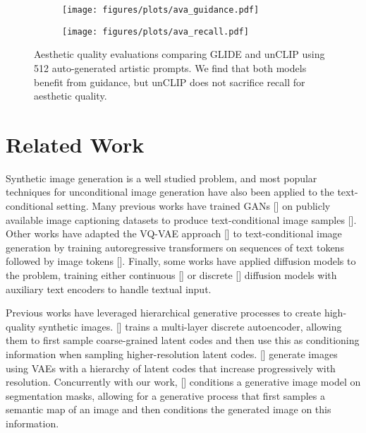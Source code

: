 \documentclass{article}
\newcommand{\shortcite}[1]{[\citenum{#1}]}
\newcommand{\namecite}[1]{\citeauthor{#1} [\citenum{#1}]}
\newcommand{\modelname}{unCLIP}
\begin{document}
\begin{figure}[t]
    \begin{center}
    \begin{subfigure}{0.475\textwidth}
        \centering
        \texttt{[image: figures/plots/ava\_guidance.pdf]}
    \end{subfigure}
    \begin{subfigure}{0.475\textwidth}
        \centering
        \texttt{[image: figures/plots/ava\_recall.pdf]}
    \end{subfigure}
    \end{center}
    \vskip -0.1in
    \caption{Aesthetic quality evaluations comparing GLIDE and \modelname{} using 512 auto-generated artistic prompts. We find that both models benefit from guidance, but \modelname{} does not sacrifice recall for aesthetic quality.}
    \label{fig:ava_results}
    \vskip -0.1in
\end{figure}
\section{Related Work}

Synthetic image generation is a well studied problem, and most popular techniques for unconditional image generation have also been applied to the text-conditional setting. Many previous works have trained GANs \shortcite{gan} on publicly available image captioning datasets to produce text-conditional image samples \shortcite{attngan,dmgan,dfgan,xmcgan,textcl}. Other works have adapted the VQ-VAE approach \shortcite{vqvae} to text-conditional image generation by training autoregressive transformers on sequences of text tokens followed by image tokens \shortcite{dalle,cogview,cm3}. Finally, some works have applied diffusion models to the problem, training either continuous \shortcite{glide} or discrete \shortcite{vqdiff} diffusion models with auxiliary text encoders to handle textual input.

Previous works have leveraged hierarchical generative processes to create high-quality synthetic images. \namecite{vqvae2} trains a multi-layer discrete autoencoder, allowing them to first sample coarse-grained latent codes and then use this as conditioning information when sampling higher-resolution latent codes. \namecite{vdvae,nvae} generate images using VAEs with a hierarchy of latent codes that increase progressively with resolution. Concurrently with our work, \namecite{makeascene} conditions a generative image model on segmentation masks, allowing for a generative process that first samples a semantic map of an image and then conditions the generated image on this information.
\end{document}
